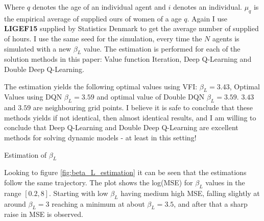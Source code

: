 Where $q$ denotes the age of an individual agent and $i$ denotes an individual. $\mu_q$ is the empirical average of supplied ours of women of a age 	$q$. Again I use \textbf{LIGEF15} supplied by Statistics Denmark to get the average number of supplied of hours. I use the same seed for the simulation, every time the $N$ agents is simulated with a new $\beta_L$ value. The estimation is performed for each of the solution methods in this paper: Value function Iteration, Deep Q-Learning and Double Deep Q-Learning. 

The estimation yields the following optimal values using VFI: $\beta_L=3.43$, Optimal Values using DQN $\beta_L=3.59$ and optimal value of Double DQN $\beta_L=3.59$. $3.43$ and $3.59$ are neighbouring grid points. I believe it is safe to conclude that these methods yields if not identical, then almost identical results, and I am willing to conclude that Deep Q-Learning and Double Deep Q-Learning are excellent methods for solving dynamic models - at least in this setting!

\begin{table}[ht]
    \centering
    
    \caption{Estimation of $\beta_L$}
    \label{tab:beta_L_Estimation}
\end{table}

Looking to figure \ref{fig:beta_L_estimation} it can be seen that the estimations follow the same trajectory. The plot shows the log(MSE) for $\beta_L$ values in the range $[0.2, 8]$. Starting with low $\beta_L$ having medium high MSE, falling slightly at around $\beta_L = 3$ reaching a minimum at about $\beta_L = 3.5$, and after that a sharp raise in MSE is observed. 

